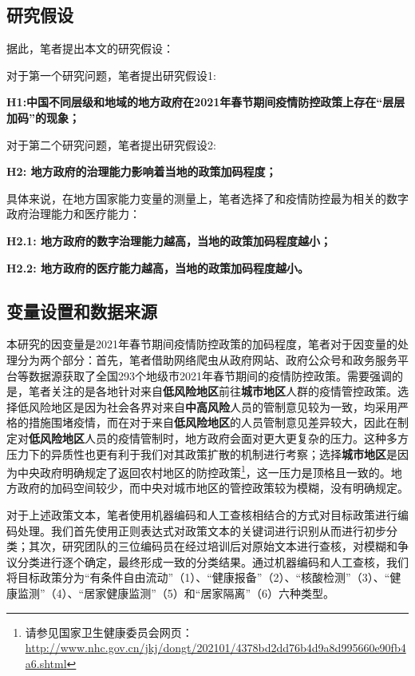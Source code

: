 \documentclass[
  12pt,
]{ctexart}
\begin{document}
\hypertarget{ux7814ux7a76ux5047ux8bbe}{%
\subsection{研究假设}\label{ux7814ux7a76ux5047ux8bbe}}

据此，笔者提出本文的研究假设：

对于第一个研究问题，笔者提出研究假设1:

\textbf{H1:中国不同层级和地域的地方政府在2021年春节期间疫情防控政策上存在``层层加码''的现象；}

对于第二个研究问题，笔者提出研究假设2:

\textbf{H2: 地方政府的治理能力影响着当地的政策加码程度；}

具体来说，在地方国家能力变量的测量上，笔者选择了和疫情防控最为相关的数字政府治理能力和医疗能力：

\textbf{H2.1: 地方政府的数字治理能力越高，当地的政策加码程度越小；}

\textbf{H2.2: 地方政府的医疗能力越高，当地的政策加码程度越小。}

\hypertarget{ux53d8ux91cfux8bbeux7f6eux548cux6570ux636eux6765ux6e90}{%
\subsection{变量设置和数据来源}\label{ux53d8ux91cfux8bbeux7f6eux548cux6570ux636eux6765ux6e90}}

本研究的因变量是2021年春节期间疫情防控政策的加码程度，笔者对于因变量的处理分为两个部分：首先，笔者借助网络爬虫从政府网站、政府公众号和政务服务平台等数据源获取了全国293个地级市2021年春节期间的疫情防控政策。需要强调的是，笔者关注的是各地针对来自\textbf{低风险地区}前往\textbf{城市地区}人群的疫情管控政策。选择低风险地区是因为社会各界对来自\textbf{中高风险}人员的管制意见较为一致，均采用严格的措施围堵疫情，而在对于来自\textbf{低风险地区}的人员管制意见差异较大，因此在制定对\textbf{低风险地区}人员的疫情管制时，地方政府会面对更大更复杂的压力。这种多方压力下的异质性也更有利于我们对其政策扩散的机制进行考察；选择\textbf{城市地区}是因为中央政府明确规定了返回农村地区的防控政策\footnote{请参见国家卫生健康委员会网页：\url{http://www.nhc.gov.cn/jkj/dongt/202101/4378bd2dd76b4d9a8d995660e90fb4a6.shtml}}，这一压力是顶格且一致的。地方政府的加码空间较少，而中央对城市地区的管控政策较为模糊，没有明确规定。

对于上述政策文本，笔者使用机器编码和人工查核相结合的方式对目标政策进行编码处理。我们首先使用正则表达式对政策文本的关键词进行识别从而进行初步分类；其次，研究团队的三位编码员在经过培训后对原始文本进行查核，对模糊和争议分类进行逐个确定，最终形成一致的分类结果。通过机器编码和人工查核，我们将目标政策分为``有条件自由流动''（1）、``健康报备''（2）、``核酸检测''（3）、``健康监测''（4）、``居家健康监测''（5）和``居家隔离''（6）六种类型。
\end{document}
